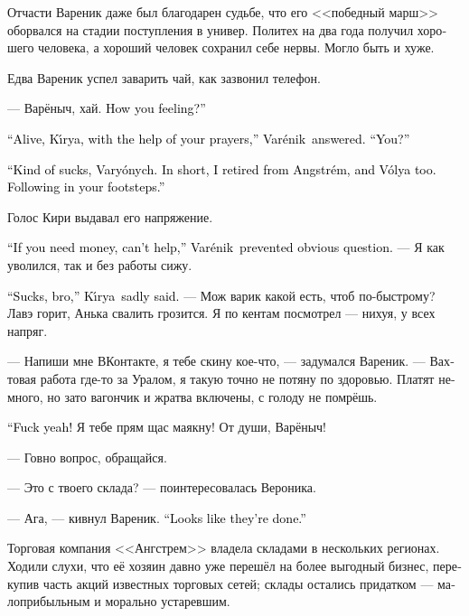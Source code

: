 \documentclass[a5paper,12pt,fleqn]{extbook}\usepackage{cooltooltips}\usepackage{polyglossia}\setdefaultlanguage[babelshorthands=true]{russian}\setotherlanguage{english}\defaultfontfeatures{Ligatures=TeX,Mapping=tex-text} \usepackage{xcolor}\definecolor{lightgray}{HTML}{bbbbbb}\color{lightgray}\newcommand{\ml}[3]{\textenglish{\textcolor{black}{#3}}}
\newcommand{\asterism}{\vspace{1em}{\centering\Large\bfseries$\ast~\ast~\ast$\par}\vspace{1em}}
\newcommand{\Varenik}{Var\'enik}
\newcommand{\Kirya}{K\'{\i}rya}
\begin{document}
Отчасти Вареник даже был благодарен судьбе, что его <<победный марш>> оборвался на стадии поступления в универ.
Политех на два года получил хорошего человека, а хороший человек сохранил себе нервы.
Могло быть и хуже.

\asterism

Едва Вареник успел заварить чай, как зазвонил телефон.

--- Варёныч, хай.
\ml{$0$}
{Как здравие?}
{How you feeling?''}

\ml{$0$}
{--- Жив, Киря, твоими молитвами, --- лаконично ответил Вареник.}
{``Alive, \Kirya, with the help of your prayers,'' \Varenik\ answered.}
\ml{$0$}
{--- Сам как?}
{``You?''}

\ml{$0$}
{--- Да как-то вот, Варёныч.}
{``Kind of sucks, Vary\'onych.}
\ml{$0$}
{Короче, ушёл я из <<Ангстрема>>, и Воля ушёл.}
{In short, I retired from Angstr\'em, and V\'olya too.}
\ml{$0$}
{По твоим стопам.}
{Following in your footsteps.''}

Голос Кири выдавал его напряжение.

\ml{$0$}
{--- Если ты хочешь занять, не могу помочь, --- предупредил Вареник очевидный вопрос.}
{``If you need money, can't help,'' \Varenik\ prevented obvious question.}
--- Я как уволился, так и без работы сижу.

\ml{$0$}
{--- Бля, братан, --- опечалился Киря.}
{``Sucks, bro,'' \Kirya\ sadly said.}
--- Мож варик какой есть, чтоб по-быстрому?
Лавэ горит, Анька свалить грозится.
Я по кентам посмотрел --- нихуя, у всех напряг.

--- Напиши мне ВКонтакте, я тебе скину кое-что, --- задумался Вареник.
--- Вахтовая работа где-то за Уралом, я такую точно не потяну по здоровью.
Платят немного, но зато вагончик и жратва включены, с голоду не помрёшь.

\ml{$0$}
{--- Заебись!}
{``Fuck yeah!}
Я тебе прям щас маякну!
От души, Варёныч!

--- Говно вопрос, обращайся.

--- Это с твоего склада? --- поинтересовалась Вероника.

--- Ага, --- кивнул Вареник.
\ml{$0$}
{--- Там походу всё.}
{``Looks like they're done.''}

\asterism

Торговая компания <<Ангстрем>> владела складами в нескольких регионах.
Ходили слухи, что её хозяин давно уже перешёл на более выгодный бизнес, перекупив часть акций известных торговых сетей;
склады остались придатком --- малоприбыльным и морально устаревшим.
\end{document}
